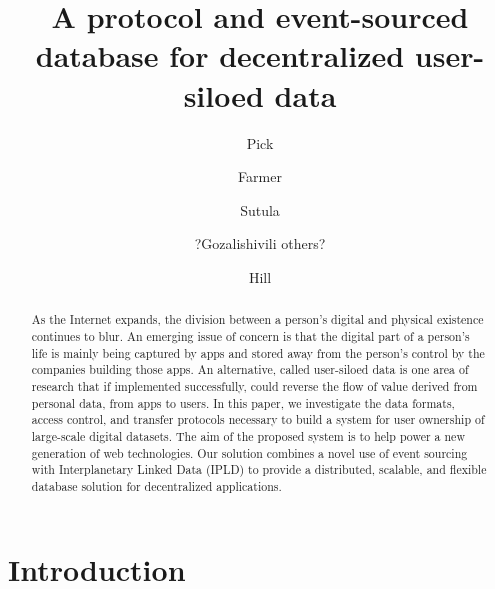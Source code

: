\documentclass{textile}
\begin{document}
\pagecolor{white}

\title[Textile Threads]{A protocol and event-sourced database for decentralized user-siloed data}
\author{Pick}
\author{Farmer}
\author{Sutula}
 
\author{?Gozalishivili others?}
 
\author{Hill}
 






\begin{abstract}
As the Internet expands, the division between a person's digital and physical existence continues to blur. An emerging issue of concern is that the digital part of a person's life is mainly being captured by apps and stored away from the person's control by the companies building those apps. An alternative, called user-siloed data is one area of research that if implemented successfully, could reverse the flow of value derived from personal data, from apps to users. In this paper, we investigate the data formats, access control, and transfer protocols necessary to build a system for user ownership of large-scale digital datasets. The aim of the proposed system is to help power a new generation of web technologies. Our solution combines a novel use of event sourcing with Interplanetary Linked Data (IPLD) to provide a distributed, scalable, and flexible database solution for decentralized applications.
\end{abstract}

\maketitle

\section{Introduction}
\end{document}
